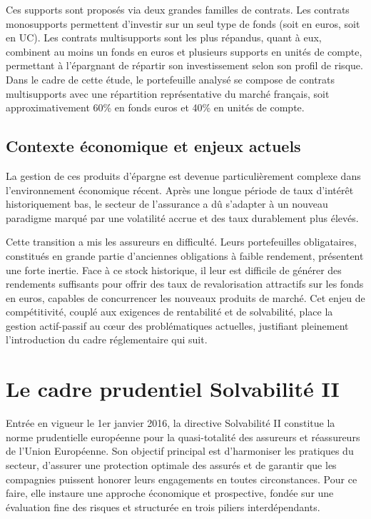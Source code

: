\bigskip

Ces supports sont proposés via deux grandes familles de contrats. Les contrats monosupports permettent d'investir sur un seul type de fonds (soit en euros, soit en UC). Les contrats multisupports sont les plus répandus, quant à eux, combinent au moins un fonds en euros et plusieurs supports en unités de compte, permettant à l'épargnant de répartir son investissement selon son profil de risque. Dans le cadre de cette étude, le portefeuille analysé se compose de contrats multisupports avec une répartition représentative du marché français, soit approximativement 60\% en fonds euros et 40\% en unités de compte.

\subsection{Contexte économique et enjeux actuels}

La gestion de ces produits d'épargne est devenue particulièrement complexe dans l'environnement économique récent. Après une longue période de taux d'intérêt historiquement bas, le secteur de l'assurance a dû s'adapter à un nouveau paradigme marqué par une volatilité accrue et des taux durablement plus élevés.

\bigskip

Cette transition a mis les assureurs en difficulté. Leurs portefeuilles obligataires, constitués en grande partie d'anciennes obligations à faible rendement, présentent une forte inertie. Face à ce stock historique, il leur est difficile de générer des rendements suffisants pour offrir des taux de revalorisation attractifs sur les fonds en euros, capables de concurrencer les nouveaux produits de marché. Cet enjeu de compétitivité, couplé aux exigences de rentabilité et de solvabilité, place la gestion actif-passif au cœur des problématiques actuelles, justifiant pleinement l'introduction du cadre réglementaire qui suit.

\section{Le cadre prudentiel Solvabilité II}
\label{sec:s2}

Entrée en vigueur le 1er janvier 2016, la directive Solvabilité II constitue la norme prudentielle européenne pour la quasi-totalité des assureurs et réassureurs de l'Union Européenne. Son objectif principal est d'harmoniser les pratiques du secteur, d'assurer une protection optimale des assurés et de garantir que les compagnies puissent honorer leurs engagements en toutes circonstances. Pour ce faire, elle instaure une approche économique et prospective, fondée sur une évaluation fine des risques et structurée en trois piliers interdépendants.

